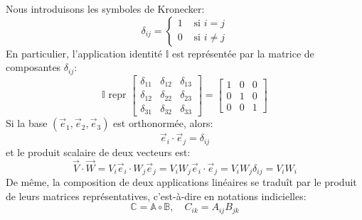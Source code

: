 Nous introduisons les symboles de Kronecker:
\begin{equation}
    \delta_{ij} = 
    \begin{cases} 
        1 & \text{ si } i = j\\
        0 & \text{ si } i \neq j
    \end{cases}
    \label{eq:AnnA-004}
\end{equation}
En particulier, l'application identité $\mathbb{I}$ est représentée par la matrice de composantes $\delta_{ij}$:
\begin{displaymath}
    \mathbb{I} \text{ repr } 
    \begin{bmatrix}
        \delta_{11} & \delta_{12} & \delta_{13} \\
        \delta_{12} & \delta_{22} & \delta_{23} \\
        \delta_{31} & \delta_{32} & \delta_{33} 
    \end{bmatrix}
    =
    \begin{bmatrix}
        1 & 0 & 0 \\
        0 & 1 & 0 \\
        0 & 0 & 1
    \end{bmatrix}
\end{displaymath}
Si la base $(\vec{e}_1,\vec{e}_2,\vec{e}_3)$ est orthonormée, alors:
\begin{equation}
    \vec{e}_i \cdot \vec{e}_j = \delta_{ij}
    \label{eq:AnnA-005}
\end{equation}
et le produit scalaire de deux vecteurs est:
\begin{equation}
        \vec{V} \cdot \vec{W} = V_i \vec{e}_i \cdot W_j \vec{e}_j = V_i W_j \vec{e}_i \cdot \vec{e}_j
         = V_i W_j \delta_{ij}  =V_i W_i
    \label{eq:AnnA-006}
\end{equation}
De même, la composition de deux applications linéaires se traduît par le produit de leurs matrices représentatives, c'est-à-dire en notations indicielles:
\begin{equation}
    \mathbb{C} = \mathbb{A} \circ \mathbb{B}, \quad C_{ik} = A_{ij} B_{jk}
    \label{eq:AnnA-007}
\end{equation}
